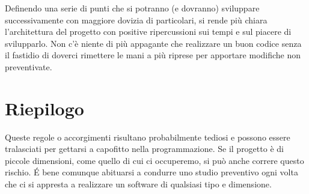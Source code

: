 Definendo una serie di punti che si potranno (e dovranno) sviluppare successivamente con maggiore dovizia di particolari, si rende più chiara l'architettura del progetto con positive ripercussioni sui tempi e sul piacere di svilupparlo. Non c'è niente di più appagante che realizzare un buon codice senza il fastidio di doverci rimettere le mani a più riprese per apportare modifiche non preventivate.

\section{Riepilogo}
Queste regole o accorgimenti risultano probabilmente tediosi e possono essere tralasciati per gettarsi a capofitto nella programmazione. Se il progetto è di piccole dimensioni, come quello di cui ci occuperemo, si può anche correre questo rischio. \'E bene comunque abituarsi a condurre uno studio preventivo ogni volta che ci si appresta a realizzare un software di qualsiasi tipo e dimensione.